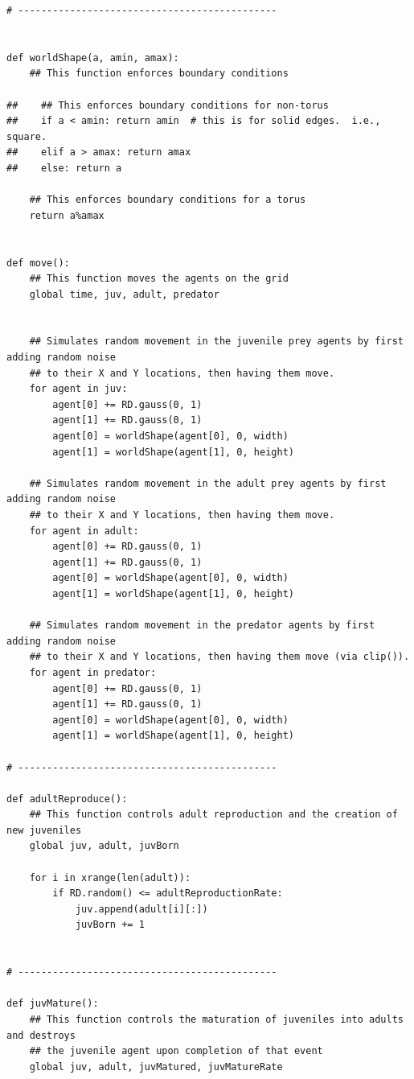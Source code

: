 \documentclass[12pt]{article}
\begin{document}
\begin{lstlisting}
# ---------------------------------------------


def worldShape(a, amin, amax):
    ## This function enforces boundary conditions

##    ## This enforces boundary conditions for non-torus
##    if a < amin: return amin  # this is for solid edges.  i.e., square.
##    elif a > amax: return amax
##    else: return a
    
    ## This enforces boundary conditions for a torus
    return a%amax


def move():
    ## This function moves the agents on the grid 
    global time, juv, adult, predator


    ## Simulates random movement in the juvenile prey agents by first adding random noise
    ## to their X and Y locations, then having them move.
    for agent in juv:
        agent[0] += RD.gauss(0, 1)
        agent[1] += RD.gauss(0, 1)
        agent[0] = worldShape(agent[0], 0, width)
        agent[1] = worldShape(agent[1], 0, height)

    ## Simulates random movement in the adult prey agents by first adding random noise
    ## to their X and Y locations, then having them move.
    for agent in adult:
        agent[0] += RD.gauss(0, 1)
        agent[1] += RD.gauss(0, 1)
        agent[0] = worldShape(agent[0], 0, width)
        agent[1] = worldShape(agent[1], 0, height)

    ## Simulates random movement in the predator agents by first adding random noise
    ## to their X and Y locations, then having them move (via clip()).
    for agent in predator:
        agent[0] += RD.gauss(0, 1)
        agent[1] += RD.gauss(0, 1)
        agent[0] = worldShape(agent[0], 0, width)
        agent[1] = worldShape(agent[1], 0, height)

# ---------------------------------------------

def adultReproduce():
    ## This function controls adult reproduction and the creation of new juveniles
    global juv, adult, juvBorn

    for i in xrange(len(adult)):
        if RD.random() <= adultReproductionRate:
            juv.append(adult[i][:])
            juvBorn += 1
            

# ---------------------------------------------

def juvMature():
    ## This function controls the maturation of juveniles into adults and destroys
    ## the juvenile agent upon completion of that event
    global juv, adult, juvMatured, juvMatureRate


\end{lstlisting}
\end{document}
